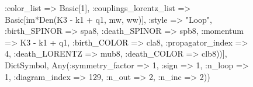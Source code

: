 \documentclass{revtex4}
\begin{document}
\begin{figure}[!htb]
\begin{center}
{:color_list => Basic[1], :couplings_lorentz_list => Basic[im*Den(K3 - k1 + q1, mw, ww)], :style => "Loop", :birth_SPINOR => spa8, :death_SPINOR => spb8, :momentum => K3 - k1 + q1, :birth_COLOR => cla8, :propagator_index => 4, :death_LORENTZ => mub8, :death_COLOR => clb8))], Dict{Symbol, Any}(:symmetry_factor => 1, :sign => 1, :n_loop => 1, :diagram_index => 129, :n_out => 2, :n_inc => 2)) 
}
\end{center}
\end{figure}
\end{document}
